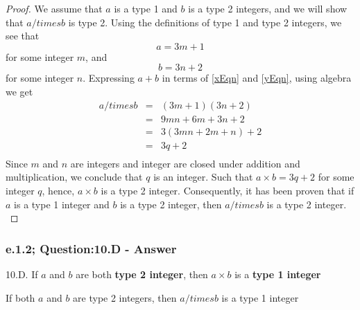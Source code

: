 \begin{proof}
We assume that $a$ is a type 1 and $b$ is a type 2 integers, and we will show that $a /times b$ is type 2. Using the definitions of type 1 and type 2 integers, we see that
\begin{equation}
\label{xEqn}
a = 3m + 1
\end{equation}
for some integer $m$, and
\begin{equation}
\label{yEqn}
b = 3n + 2
\end{equation}
for some integer $n$. Expressing $a + b$ in terms of \ref{xEqn} and \ref{yEqn}, using algebra we get
\begin{eqnarray*}
a /times b & = & (3m + 1)(3n + 2)  \nonumber \\
& = & 9mn + 6m + 3n + 2 \nonumber \\
& = & 3(3mn + 2m + n) + 2 \nonumber \\
& = & 3q + 2 \nonumber \\
\end{eqnarray*}
Since $m$ and $n$ are integers and integer are closed under addition and multiplication, we conclude that $q$ is an integer. Such that $a \times b = 3q + 2$ for some integer $q$, hence, $a \times b$ is a type 2 integer. Consequently, it has been proven that if $a$ is a type 1 integer and $b$ is a type 2 integer, then $a /times b$ is a type 2 integer. \\
\end{proof}


\subsubsection*{e.1.2; Question:10.D - Answer}
10.D. If $a$ and $b$ are both {\bf type 2 integer}, then $a \times b$ is a {\bf type 1 integer} \\

\begin{tcolorbox}
\begin{theorem}
If both $a$ and $b$ are type 2 integers, then $a /times b$ is a type 1 integer
\end{theorem}
\end{tcolorbox}

